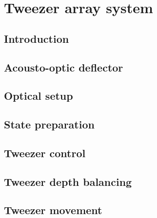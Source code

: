 \documentclass[twoside]{article}
\begin{document}
\newpage
\section{Tweezer array system} \label{sec:tweezer}

\subsection{Introduction} \label{subsec:state-prepation-overview}


\subsection{Acousto-optic deflector} \label{subsec:aodconcept}

\subsection{Optical setup} \label{subsec:optical-setup}

\subsection{State preparation} \label{subsec:state-preparation}

\subsection{Tweezer control} \label{subsec:control}


\subsection{Tweezer depth balancing} \label{subsec:balancing}


\subsection{Tweezer movement} \label{subsec:tweezer-movement}

\end{document}
